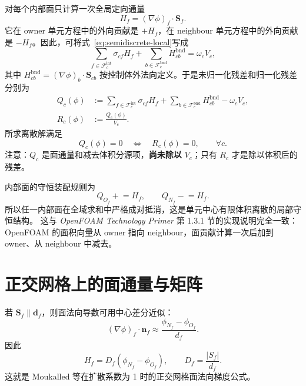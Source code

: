 \documentclass[UTF8,a4paper,11pt]{ctexart}
\newcommand{\vect}[1]{\bm{#1}}
\newcommand{\Sf}{\vect S_f}
\newcommand{\df}{\vect d_f}
\newcommand{\nf}{\vect n_f}
\begin{document}
对每个内部面只计算一次全局定向通量
\begin{equation}
  H_f=(\nabla\phi)_f\cdot\Sf .
  \label{eq:Hdef}
\end{equation}
它在 owner 单元方程中的外向贡献是 \(+H_f\)，在 neighbour 单元方程中的外向贡献是 \(-H_f\)。因此，可将式~\eqref{eq:semidiscrete-local}写成
\begin{equation}
  \sum_{f\in\mathcal F_c^{\mathrm{int}}}\sigma_{cf}H_f
  +\sum_{b\in\mathcal F_c^{\mathrm{bnd}}}H_{cb}^{\mathrm{bnd}}
  =\omega_cV_c ,
  \label{eq:globalfluxform}
\end{equation}
其中
\(H_{cb}^{\mathrm{bnd}}=(\nabla\phi)_b\cdot\vect S_{cb}\)
按控制体外法向定义。于是未归一化残差和归一化残差分别为
\begin{align}
  Q_c(\phi)
  &:=\sum_{f\in\mathcal F_c^{\mathrm{int}}}\sigma_{cf}H_f
  +\sum_{b\in\mathcal F_c^{\mathrm{bnd}}}H_{cb}^{\mathrm{bnd}}
  -\omega_cV_c,                                      \label{eq:Qc}\\
  R_c(\phi)&:=\frac{Q_c(\phi)}{V_c}.                 \label{eq:Rc}
\end{align}
所求离散解满足
\begin{equation}
  \boxed{Q_c(\phi)=0\quad\Longleftrightarrow\quad R_c(\phi)=0,
  \qquad \forall c.}
  \label{eq:reszero}
\end{equation}
注意：\(Q_c\) 是面通量和减去体积分源项，\textbf{尚未除以} \(V_c\)；只有 \(R_c\) 才是除以体积后的残差。

内部面的守恒装配规则为
\begin{equation}
  Q_{O_f}\mathrel{+}=H_f,
  \qquad
  Q_{N_f}\mathrel{-}=H_f.
  \label{eq:assemblyflux}
\end{equation}
所以任一内部面在全域求和中严格成对抵消，这是单元中心有限体积离散的局部守恒结构。
这与 \textit{OpenFOAM Technology Primer} 第 1.3.1 节的实现说明完全一致：OpenFOAM 的面积向量从 owner 指向 neighbour，面贡献计算一次后加到 owner、从 neighbour 中减去\cite[第 1.3.1 节，第 28--29 页]{OFPrimer}。

\section{正交网格上的面通量与矩阵}

若 \(\Sf\parallel\df\)，则面法向导数可用中心差分近似：
\begin{equation}
  (\nabla\phi)_f\cdot\nf
  \approx\frac{\phi_{N_f}-\phi_{O_f}}{d_f}.
  \label{eq:orthsn}
\end{equation}
因此
\begin{equation}
  \boxed{
  H_f=D_f(\phi_{N_f}-\phi_{O_f}),
  \qquad
  D_f=\frac{|S_f|}{d_f}.}
  \label{eq:orthflux}
\end{equation}
这就是 Moukalled 等\cite[式 (8.63)]{Moukalled2016}在扩散系数为 1 时的正交网格面法向梯度公式。
\end{document}
